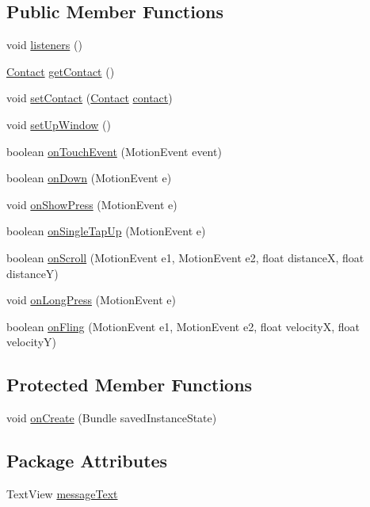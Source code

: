 \subsection*{Public Member Functions}
\begin{DoxyCompactItemize}
\item 
void \hyperlink{a00012_a92b8e0730130e1184a8cdbd89590779d}{listeners} ()
\item 
\hyperlink{a00005}{Contact} \hyperlink{a00012_adb647c7ae09f1d5755db63d701968925}{get\+Contact} ()
\item 
void \hyperlink{a00012_abef3c7b6635dc06ac6b8e4b37c51b37f}{set\+Contact} (\hyperlink{a00005}{Contact} \hyperlink{a00012_a3459849ab29ad684658dbcd0cf8c5d5a}{contact})
\item 
void \hyperlink{a00012_ae101bc9d661896c7dda12efd1e7b91d2}{set\+Up\+Window} ()
\item 
boolean \hyperlink{a00012_ab52b3ce187f918e0bc8f5a34c1e347a3}{on\+Touch\+Event} (Motion\+Event event)
\item 
boolean \hyperlink{a00012_afe7febda1f2210be8658c06fce770e1c}{on\+Down} (Motion\+Event e)
\item 
void \hyperlink{a00012_a929cec72582aad79985fd2927344b9c7}{on\+Show\+Press} (Motion\+Event e)
\item 
boolean \hyperlink{a00012_a05333c5dbd12d347d100d8cb029e4530}{on\+Single\+Tap\+Up} (Motion\+Event e)
\item 
boolean \hyperlink{a00012_af912304fa5a847e1231b71015c2ed06a}{on\+Scroll} (Motion\+Event e1, Motion\+Event e2, float distance\+X, float distance\+Y)
\item 
void \hyperlink{a00012_ac12f39cb7fd9003b2aa5ddf76f2e93fe}{on\+Long\+Press} (Motion\+Event e)
\item 
boolean \hyperlink{a00012_ae44fb084c2495a486a664f60ae319b8c}{on\+Fling} (Motion\+Event e1, Motion\+Event e2, float velocity\+X, float velocity\+Y)
\end{DoxyCompactItemize}
\subsection*{Protected Member Functions}
\begin{DoxyCompactItemize}
\item 
void \hyperlink{a00012_a85e87cb5ced88dff7c8173ecc4f636d1}{on\+Create} (Bundle saved\+Instance\+State)
\end{DoxyCompactItemize}
\subsection*{Package Attributes}
\begin{DoxyCompactItemize}
\item 
Text\+View \hyperlink{a00012_a4d3c87657c6cce664136ba8ae0a78c52}{message\+Text}
\end{DoxyCompactItemize}
